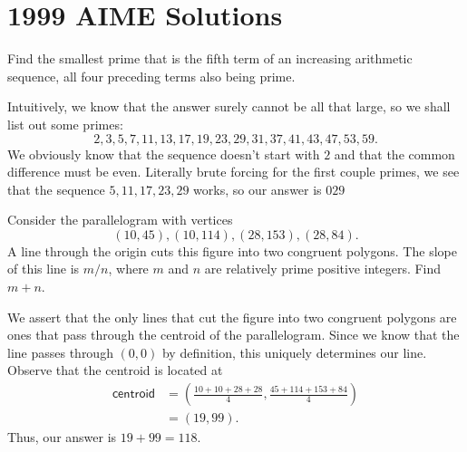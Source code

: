 \documentclass[a4paper, 12pt]{article}
\begin{document}
\section*{1999 AIME Solutions}

\begin{chirpbox}
    \begin{problemnum}
        Find the smallest prime that is the fifth term of an increasing arithmetic sequence, all four preceding terms also being prime.
    \end{problemnum}
\end{chirpbox}

\begin{solution}
    Intuitively, we know that the answer surely cannot be all that large, so we shall list out some primes:
    \[
        2, 3, 5, 7, 11, 13, 17, 19, 23, 29, 31, 37, 41, 43, 47, 53, 59
    .\]
    We obviously know that the sequence doesn't start with \( 2 \) and that the common difference must be even. Literally brute forcing for the first couple primes, we see that the sequence \( 5, 11, 17, 23, 29 \) works, so our answer is \( \boxed{029} \)
\end{solution}

\begin{chirpbox}
    \begin{problemnum}
        Consider the parallelogram with vertices
        \[
            (10, 45), (10, 114), (28,
        153), (28, 84)
        .\]
        A line through the origin cuts this figure into two
        congruent polygons. The slope of this line is \( m/n \), where \( m \)
        and \( n \) are relatively prime positive integers. Find \( m + n \).
    \end{problemnum}
\end{chirpbox}

\begin{solution}
    We assert that the only lines that cut the figure into two congruent polygons are ones that pass through the centroid of the parallelogram. Since we know that the line passes through \( (0,0) \) by definition, this uniquely determines our line. Observe that the centroid is located at
    \begin{align*}
        \textsf{centroid} &= \left(\frac{10 + 10 + 28 + 28}{4}, \frac{45 + 114 + 153 + 84}{4} \right) \\
        &= \left( 19, 99 \right)
    .\end{align*}
    Thus, our answer is \( 19 + 99 = \boxed{118} \).
\end{solution}
\end{document}
